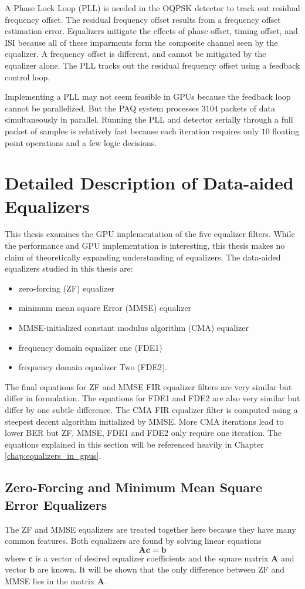 A Phase Lock Loop (PLL) is needed in the OQPSK detector to track out residual frequency offset.
The residual frequency offset results from a frequency offset estimation error.
Equalizers mitigate the effects of phase offset, timing offset, and ISI because all of these imparments form the  composite channel seen by the equalizer.
A frequency offset is different, and cannot be mitigated by the equalizer alone.
The PLL tracks out the residual frequency offset using a feedback control loop.

Implementing a PLL may not seem feasible in GPUs because the feedback loop cannot be parallelized.
But the PAQ system processes $3104$ packets of data simultaneously in parallel.
Running the PLL and detector serially through a full packet of samples is relatively fast because each iteration requires only $10$ floating point operations and a few logic decisions.

\section{Detailed Description of Data-aided Equalizers}
\label{sec:equalizer_eq}
This thesis examines the GPU implementation of the five equalizer filters.
While the performance and GPU implementation is interesting, this thesis makes no claim of theoretically expanding understanding of equalizers.
The data-aided equalizers studied in this thesis are:
\begin{itemize}
\item zero-forcing (ZF) equalizer
\item minimum mean square Error (MMSE) equalizer
\item MMSE-initialized constant modulus algorithm (CMA) equalizer
\item frequency domain equalizer one (FDE1)
\item frequency domain equalizer Two (FDE2).
\end{itemize}
The final equations for ZF and MMSE FIR equalizer filters are very similar but differ in formulation.
The equations for FDE1 and FDE2 are also very similar but differ by one subtle difference.
The CMA FIR equalizer filter is computed using a steepest decent algorithm initialized by MMSE.
More CMA iterations lead to lower BER but ZF, MMSE, FDE1 and FDE2 only require one iteration.
The equations explained in this section will be referenced heavily in Chapter \ref{chap:equalizers_in_gpus}.

\subsection{Zero-Forcing and Minimum Mean Square Error Equalizers}
\label{sec:ZFnMMSE}
The ZF and MMSE equalizers are treated together here because they have many common features.
Both equalizers are found by solving linear equations
\begin{equation}
\mathbf{A}\mathbf{c} = \mathbf{b}
\end{equation}
where $\mathbf{c}$ is a vector of desired equalizer coefficients
and the square matrix $\mathbf{A}$ and vector $\mathbf{b}$ are known.
It will be shown that the only difference between ZF and MMSE lies in the matrix $\mathbf{A}$.

